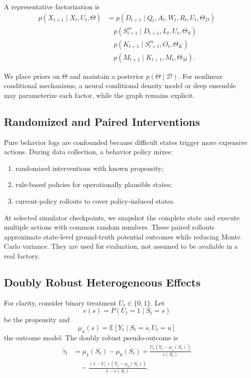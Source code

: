 \documentclass[11pt,a4paper]{article}
\newcommand{\E}{\mathbb{E}}
\begin{document}
A representative factorization is
\begin{align}
    p(X_{t+1}\mid X_t,U_t,\Theta)
    &=
    p(D_{t+1}\mid Q_t,A_t,W_t,R_t,U_t,\Theta_D)
    \nonumber\\
    &\quad
    p(S_{t+1}^{m}\mid D_{t+1},L_t,U_t,\Theta_S)
    \nonumber\\
    &\quad
    p(K_{t+1}\mid S_{t+1}^{m},O_t,\Theta_K)
    \nonumber\\
    &\quad
    p(M_{t+1}\mid K_{t+1},M_t,\Theta_M).
    \label{eq:dbn}
\end{align}

We place priors on \(\Theta\) and maintain a posterior
\(p(\Theta\mid\mathcal{D})\). For nonlinear conditional mechanisms, a neural
conditional density model or deep ensemble may parameterize each factor, while
the graph remains explicit.

\subsection{Randomized and Paired Interventions}

Pure behavior logs are confounded because difficult states trigger more
expensive actions. During data collection, a behavior policy mixes:

\begin{enumerate}[leftmargin=*]
    \item randomized interventions with known propensity;
    \item rule-based policies for operationally plausible states;
    \item current-policy rollouts to cover policy-induced states.
\end{enumerate}

At selected simulator checkpoints, we snapshot the complete state and execute
multiple actions with common random numbers. These paired rollouts approximate
state-level ground-truth potential outcomes while reducing Monte Carlo variance.
They are used for evaluation, not assumed to be available in a real factory.

\subsection{Doubly Robust Heterogeneous Effects}

For clarity, consider binary treatment \(U_t\in\{0,1\}\). Let
\[
    e(s)=P(U_t=1\mid S_t=s)
\]
be the propensity and
\[
    \mu_u(s)=\E[Y_t\mid S_t=s,U_t=u]
\]
the outcome model. The doubly robust pseudo-outcome is
\begin{align}
    \widetilde{\tau}_t
    &=
    \mu_1(S_t)-\mu_0(S_t)
    +\frac{U_t(Y_t-\mu_1(S_t))}{e(S_t)}
    \nonumber\\
    &\quad
    -\frac{(1-U_t)(Y_t-\mu_0(S_t))}{1-e(S_t)}.
    \label{eq:aipw}
\end{align}
\end{document}
